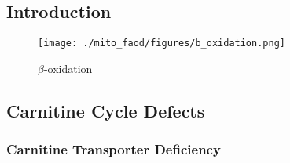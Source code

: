 \documentclass{scrartcl}
\begin{document}
\subsection{Introduction}
\label{sec:orgf2ef57e}
\begin{figure}[htbp]
\centering
\texttt{[image: ./mito\_faod/figures/b\_oxidation.png]}
\caption{\label{fig:orgefb076c}
\(\beta\)-oxidation}
\end{figure}

\subsection{Carnitine Cycle Defects}
\label{sec:org9694f25}
\subsubsection{Carnitine Transporter Deficiency}
\label{sec:org7dc0824}
\end{document}

